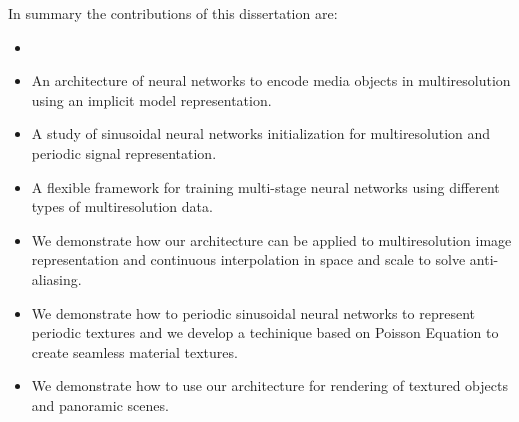 In summary the contributions of this dissertation are:

\begin{itemize}
    \item {}
    \item An architecture of neural networks to encode media objects in multiresolution using an implicit model representation.
    \item A study of sinusoidal neural networks initialization for multiresolution and periodic signal representation.
    \item A flexible framework for training multi-stage neural networks using different types of multiresolution data.
    \item We demonstrate how our architecture can be applied to multiresolution image representation and continuous interpolation in space and scale to solve anti-aliasing.
    \item We demonstrate how to periodic sinusoidal neural networks to represent periodic textures and we develop a techinique based on Poisson Equation to create seamless material textures.
    \item We demonstrate how to use our architecture for rendering of textured objects and panoramic scenes. 
\end{itemize}